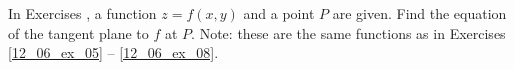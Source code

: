 {\noindent In Exercises}
{, a function $z=f(x,y)$ and  a point $P$ are given. Find the equation of the tangent plane to $f$ at $P$. Note: these are the same functions as in  Exercises \ref{12_06_ex_05} -- \ref{12_06_ex_08}.
}
